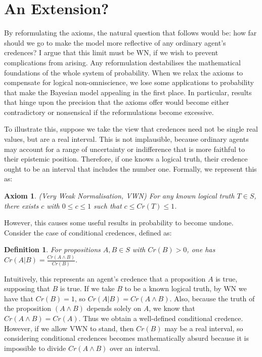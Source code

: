 \documentclass[12pt]{article}
\newtheorem{definition}{Definition}
\newtheorem{axiom}{Axiom}
\begin{document}
\section{An Extension?}
By reformulating the axioms, the natural question that follows would be: how far should we go to make the model more reflective of any ordinary agent's credences? I argue that this limit must be WN, if we wish to prevent complications from arising. Any reformulation destabilises the mathematical foundations of the whole system of probability. When we relax the axioms to compensate for logical non-omniscience, we lose some applications to probability that make the Bayesian model appealing in the first place.\autocite[436]{oup} In particular, results that hinge upon the precision that the axioms offer would become either contradictory or nonsensical if the reformulations become excessive.

To illustrate this, suppose we take the view that credences need not be single real values, but are a real interval. This is not implausible, because ordinary agents may account for a range of uncertainty or indifference that is more faithful to their epistemic position. Therefore, if one knows a logical truth, their credence ought to be an interval that includes the number one.\autocite{sep} Formally, we represent this as:
\begin{axiom}
    (Very Weak Normalisation, VWN) For any known logical truth $T\in S$, there exists $c$ with $0\leq c\leq 1$ such that $c\leq Cr(T)\leq1$.
\end{axiom}
However, this causes some useful results in probability to become undone. Consider the case of conditional credences, defined as:
\begin{definition}
    For propositions $A,B\in S$ with $Cr(B)>0$, one has $Cr(A|B)=\frac{Cr(A\land B)}{Cr(B)}$.
\end{definition}
Intuitively, this represents an agent's credence that a proposition $A$ is true, supposing that $B$ is true.\autocite[32]{bdrc} If we take $B$ to be a known logical truth, by WN we have that $Cr(B)=1$, so $Cr(A|B)=Cr(A\land B)$. Also, because the truth of the proposition $(A\land B)$ depends solely on $A$, we know that $Cr(A\land B)=Cr(A)$. Thus we obtain a well-defined conditional credence. However, if we allow VWN to stand, then $Cr(B)$ may be a real interval, so considering conditional credences becomes mathematically absurd because it is impossible to divide $Cr(A\land B)$ over an interval.
\end{document}
